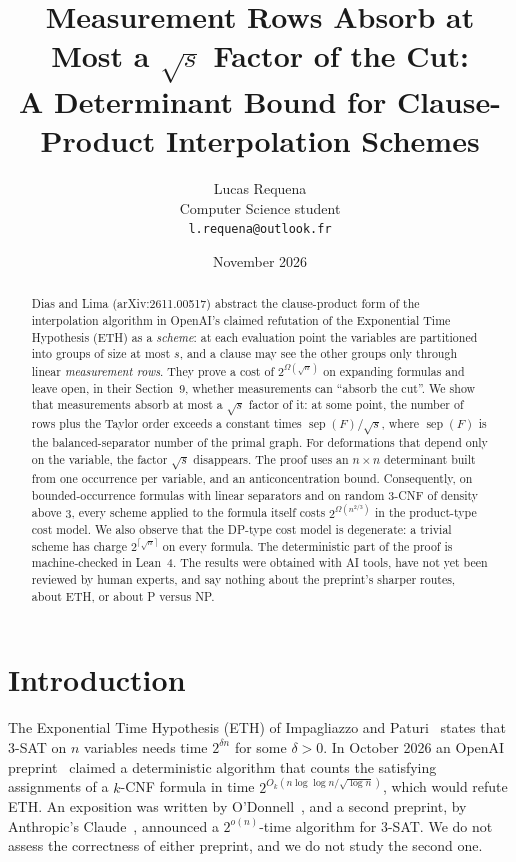 \documentclass[11pt,a4paper]{article}
\title{Measurement Rows Absorb at Most a \texorpdfstring{$\sqrt{s}$}{sqrt(s)} Factor of the Cut:\\
A Determinant Bound for Clause-Product Interpolation Schemes}
\author{Lucas Requena\\[2pt]
{\small Computer Science student}\\
{\small \texttt{l.requena@outlook.fr}}}
\date{November 2026}
\theoremstyle{definition}
\theoremstyle{remark}
\newcommand{\sep}{\operatorname{sep}}
\begin{document}
\maketitle

\begin{abstract}
Dias and Lima (arXiv:2611.00517) abstract the clause-product form of the interpolation
algorithm in OpenAI's claimed refutation of the Exponential Time Hypothesis (ETH) as a
\emph{scheme}: at each evaluation point the variables are partitioned into groups of size at
most $s$, and a clause may see the other groups only through linear \emph{measurement rows}.
They prove a cost of $2^{\Omega(\sqrt n)}$ on expanding formulas and leave open, in their
Section~9, whether measurements can ``absorb the cut''. We show that measurements absorb at
most a $\sqrt{s}$ factor of it: at some point, the number of rows plus the Taylor order
exceeds a constant times $\sep(F)/\sqrt{s}$, where $\sep(F)$ is the balanced-separator number
of the primal graph. For deformations that depend only on the variable, the factor
$\sqrt s$ disappears. The proof uses an $n\times n$ determinant built from one occurrence
per variable, and an anticoncentration bound. Consequently, on bounded-occurrence formulas
with linear separators and on random 3-CNF of density above $3$, every scheme applied to the
formula itself costs $2^{\Omega(n^{2/3})}$ in the product-type cost model. We also observe
that the DP-type cost model is degenerate: a trivial scheme has charge
$2^{\lceil\sqrt n\rceil}$ on every formula. The deterministic part of the proof is
machine-checked in Lean~4. The results were obtained with AI tools, have not yet been
reviewed by human experts, and say nothing about the preprint's sharper routes, about ETH,
or about P versus NP.
\end{abstract}

\section{Introduction}\label{sec:intro}

The Exponential Time Hypothesis (ETH) of Impagliazzo and Paturi~\cite{IP01} states that 3-SAT
on $n$ variables needs time $2^{\delta n}$ for some $\delta>0$. In October 2026 an OpenAI
preprint~\cite{OpenAI} claimed a deterministic algorithm that counts the satisfying assignments
of a $k$-CNF formula in time $2^{O_k(n\log\log n/\sqrt{\log n})}$, which would refute ETH. An
exposition was written by O'Donnell~\cite{ODonnell}, and a second preprint, by Anthropic's
Claude~\cite{Claude}, announced a $2^{o(n)}$-time algorithm for 3-SAT. We do not assess the
correctness of either preprint, and we do not study the second one.
\end{document}

